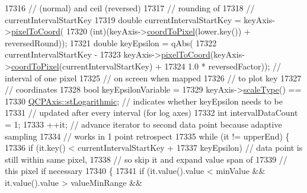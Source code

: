 \begin{DoxyCode}
17316                                             \textcolor{comment}{// (normal) and ceil (reversed)}
17317                                             \textcolor{comment}{// rounding of}
17318                                             \textcolor{comment}{// currentIntervalStartKey}
17319       \textcolor{keywordtype}{double} currentIntervalStartKey = keyAxis->\hyperlink{class_q_c_p_axis_ae9289ef7043b9d966af88eaa95b037d1}{pixelToCoord}(
17320           (\textcolor{keywordtype}{int})(keyAxis->\hyperlink{class_q_c_p_axis_a985ae693b842fb0422b4390fe36d299a}{coordToPixel}(lower.key()) + reversedRound));
17321       \textcolor{keywordtype}{double} keyEpsilon = qAbs(
17322           currentIntervalStartKey -
17323           keyAxis->\hyperlink{class_q_c_p_axis_ae9289ef7043b9d966af88eaa95b037d1}{pixelToCoord}(keyAxis->\hyperlink{class_q_c_p_axis_a985ae693b842fb0422b4390fe36d299a}{coordToPixel}(currentIntervalStartKey) +
17324                                 1.0 * reversedFactor)); \textcolor{comment}{// interval of one pixel}
17325                                                         \textcolor{comment}{// on screen when mapped}
17326                                                         \textcolor{comment}{// to plot key}
17327                                                         \textcolor{comment}{// coordinates}
17328       \textcolor{keywordtype}{bool} keyEpsilonVariable =
17329           keyAxis->\hyperlink{class_q_c_p_axis_a8563e13407bc0616da7f7c84e02de170}{scaleType}() ==
17330           \hyperlink{class_q_c_p_axis_a36d8e8658dbaa179bf2aeb973db2d6f0abf5b785ad976618816dc6f79b73216d4}{QCPAxis::stLogarithmic}; \textcolor{comment}{// indicates whether keyEpsilon needs to be}
17331                                   \textcolor{comment}{// updated after every interval (for log axes)}
17332       \textcolor{keywordtype}{int} intervalDataCount = 1;
17333       ++it; \textcolor{comment}{// advance iterator to second data point because adaptive sampling}
17334             \textcolor{comment}{// works in 1 point retrospect}
17335       \textcolor{keywordflow}{while} (it != upperEnd) \{
17336         \textcolor{keywordflow}{if} (it.key() < currentIntervalStartKey +
17337                            keyEpsilon) \textcolor{comment}{// data point is still within same pixel,}
17338                                        \textcolor{comment}{// so skip it and expand value span of}
17339                                        \textcolor{comment}{// this pixel if necessary}
17340         \{
17341           \textcolor{keywordflow}{if} (it.value().value < minValue && it.value().value > valueMinRange &&

\end{DoxyCode}
